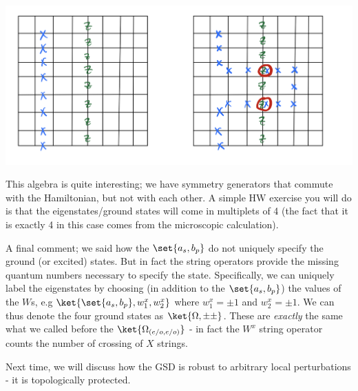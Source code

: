 \begin{center}
    \includegraphics[scale=0.4]{Lectures/Images/lec2-toruscommute.png}
\end{center}

This algebra is quite interesting; we have symmetry generators that commute with the Hamiltonian, but not with each other. A simple HW exercise you will do is that the eigenstates/ground states will come in multiplets of 4 (the fact that it is exactly 4 in this case comes from the microscopic calculation).

A final comment; we said how the $\set{a_s, b_p}$ do not uniquely specify the ground (or excited) states. But in fact the string operators provide the missing quantum numbers necessary to specify the state. Specifically, we can uniquely label the eigenstates by choosing (in addition to the $\set{a_s, b_p}$) the values of the $W$s, e.g $\ket{\set{a_s, b_p}, w_1^x, w_2^x}$ where $w_1^x = \pm 1$ and $w_2^x = \pm 1$. We can thus denote the four ground states as $\ket{\Omega, \pm\pm}$. These are \emph{exactly} the same what we called before the $\ket{\Omega_{(e/o, e/o)}}$ - in fact the $W^x$ string operator counts the number of crossing of $X$ strings.

Next time, we will discuss how the GSD is robust to arbitrary local perturbations - it is topologically protected.